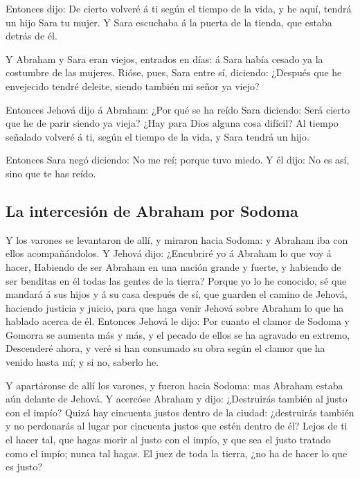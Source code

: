  Entonces dijo: De cierto volveré á ti según el tiempo de
la vida, y he aquí, tendrá un hijo Sara tu mujer. Y Sara escuchaba á la
puerta de la tienda, que estaba detrás de él.

 Y Abraham y Sara eran viejos, entrados en días: á Sara
había cesado ya la costumbre de las mujeres.  Rióse, pues,
Sara entre sí, diciendo: ¿Después que he envejecido tendré deleite,
siendo también mi señor ya viejo?

 Entonces Jehová dijo á Abraham: ¿Por qué se ha reído Sara
diciendo: Será cierto que he de parir siendo ya vieja? 
¿Hay para Dios alguna cosa difícil? Al tiempo señalado volveré á ti,
según el tiempo de la vida, y Sara tendrá un hijo.

 Entonces Sara negó diciendo: No me reí; porque tuvo miedo.
Y él dijo: No es así, sino que te has reído.

\hypertarget{la-intercesiuxf3n-de-abraham-por-sodoma}{%
\subsection{La intercesión de Abraham por
Sodoma}\label{la-intercesiuxf3n-de-abraham-por-sodoma}}

 Y los varones se levantaron de allí, y miraron hacia
Sodoma: y Abraham iba con ellos acompañándolos.  Y Jehová
dijo: ¿Encubriré yo á Abraham lo que voy á hacer,  Habiendo
de ser Abraham en una nación grande y fuerte, y habiendo de ser benditas
en él todas las gentes de la tierra?  Porque yo lo he
conocido, sé que mandará á sus hijos y á su casa después de sí, que
guarden el camino de Jehová, haciendo justicia y juicio, para que haga
venir Jehová sobre Abraham lo que ha hablado acerca de él. 
Entonces Jehová le dijo: Por cuanto el clamor de Sodoma y Gomorra se
aumenta más y más, y el pecado de ellos se ha agravado en extremo,
 Descenderé ahora, y veré si han consumado su obra según el
clamor que ha venido hasta mí; y si no, saberlo he.

 Y apartáronse de allí los varones, y fueron hacia Sodoma:
mas Abraham estaba aún delante de Jehová.  Y acercóse
Abraham y dijo: ¿Destruirás también al justo con el impío? 
Quizá hay cincuenta justos dentro de la ciudad: ¿destruirás también y no
perdonarás al lugar por cincuenta justos que estén dentro de él?
 Lejos de ti el hacer tal, que hagas morir al justo con el
impío, y que sea el justo tratado como el impío; nunca tal hagas. El
juez de toda la tierra, ¿no ha de hacer lo que es justo?

